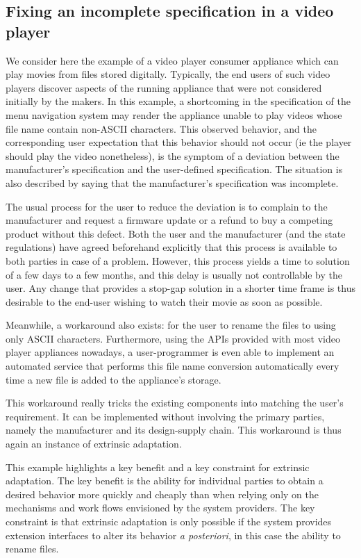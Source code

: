\documentclass[a4paper]{article}
\begin{document}
\subsection{Fixing an incomplete specification in a video player}

We consider here the example of a video player consumer appliance
which can play movies from files stored digitally.  Typically, the end
users of such video players discover aspects of the running appliance
that were not considered initially by the makers. In this example, a
shortcoming in the specification of the menu navigation system may
render the appliance unable to play videos whose file name contain
non-ASCII characters. This observed behavior, and the corresponding
user expectation that this behavior should not occur (ie the player
should play the video nonetheless), is the symptom of a deviation
between the manufacturer's specification and the user-defined
specification. The situation is also described by saying that the
manufacturer's specification was incomplete.

The usual process for the user to reduce the deviation is to complain
to the manufacturer and request a firmware update or a refund to buy a
competing product without this defect. Both the user and the
manufacturer (and the state regulations) have agreed beforehand
explicitly that this process is available to both parties in case of a
problem.  However, this process yields a time to solution of a few
days to a few months, and this delay is usually not controllable by
the user. Any change that provides a stop-gap solution in a shorter
time frame is thus desirable to the end-user wishing to watch their
movie as soon as possible.

Meanwhile, a workaround also exists: for the user to rename the files to
using only ASCII characters. Furthermore, using the APIs
provided with most video player appliances nowadays, a
user-programmer is even able to implement an automated service that
performs this file name conversion automatically every time a new file
is added to the appliance's storage.

This workaround really tricks the existing components into matching
the user's requirement. It can be implemented without involving the
primary parties, namely the manufacturer and its design-supply
chain. This workaround is thus again an instance of extrinsic
adaptation.

This example highlights a key benefit and a key constraint for
extrinsic adaptation.  The key benefit is the ability for individual
parties to obtain a desired behavior more quickly and cheaply than
when relying only on the mechanisms and work flows envisioned by the
system providers. The key constraint is that extrinsic adaptation is
only possible if the system provides extension interfaces to alter its
behavior \textsl{a posteriori}, in this case the ability to rename
files.
\end{document}

